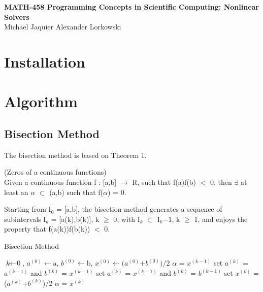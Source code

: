 \documentclass[11pt, a4paper]{article}
\begin{document}
\begingroup
\thispagestyle{empty}
\centering
\par\normalfont\fontsize{15}{20}\sffamily\selectfont
\textbf{MATH-458 Programming Concepts in Scientific Computing: Nonlinear Solvers}\\
\vspace*{0.4cm}
{\large{Michael Jaquier}}
\hspace*{0.5cm}
{\large{Alexander Lorkowski}}\par 
\endgroup

\section{Installation}

\section{Algorithm}
\subsection{Bisection Method}
The bisection method is based on Theorem 1.
\begin{theo}
  (Zeros of a continuous functions)\\
  Given a continuous function f : [a,b] $\rightarrow$ R, such that f(a)f(b) $<$ 0, then $\exists$ at least an $\alpha$ $\subset$ (a,b) such that f($\alpha$) = 0.
\end{theo}

Starting from I$_0$ = [a,b], the bisection method generates a sequence of subintervals I$_k$ = [a(k),b(k)], k $\geq$ 0, with I$_k$ $\subset$ I$_k$−1, k $\geq$ 1, and enjoys the property that f(a(k))f(b(k)) $<$ 0.

\begin{algorithm}
  \caption{Bisection Method}\label{bisection}
  \begin{algorithmic}[1]
    \State  $\textit{k} \gets \text{0}$, $\textit{$a^{(0)}$} \gets \text{a}$, $\textit{$b^{(0)}$} \gets \text{b}$, $\textit{$x^{(0)}$} \gets \text{($a^{(0)}$+$b^{(0)}$)/2}$
    \Return $\alpha$ = $x^{(k-1)}$
    \Else
    \State set $a^{(k)}$ = $a^{(k-1)}$ and $b^{(k)}$ = $x^{(k-1)}$
    \EndIf
    \State set $a^{(k)}$ = $x^{(k-1)}$ and $b^{(k)}$ = $b^{(k-1)}$
    \EndIf
    \State set $x^{(k)}$ = ($a^{(k)}$+$b^{(k)}$)/2
    \EndIf
    \EndWhile
    \Return $\alpha$ = $x^{(k)}$
  \end{algorithmic}
\end{algorithm}
\end{document}
